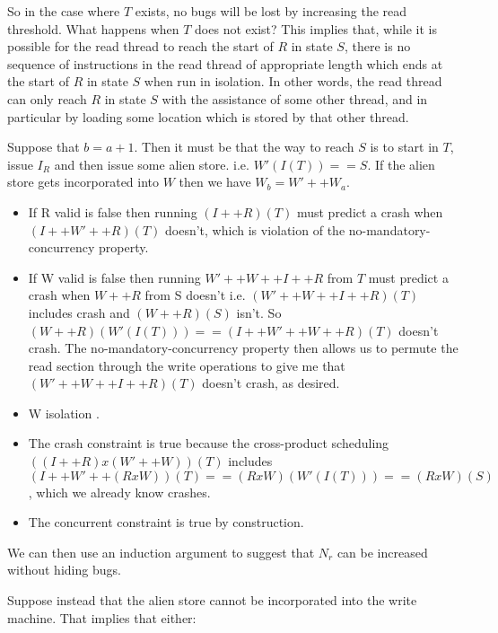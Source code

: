\documentclass[12pt,a4paper]{book}
\begin{document}
So in the case where $T$ exists, no bugs will be lost by increasing the read threshold.
What happens when $T$ does not exist?
This implies that, while it is possible for the read thread to reach the start of $R$ in state $S$, there is no sequence of instructions in the read thread of appropriate length which ends at the start of $R$ in state $S$ when run in isolation.
In other words, the read thread can only reach $R$ in state $S$ with the assistance of some other thread, and in particular by loading some location which is stored by that other thread.

Suppose that $b = a + 1$.
Then it must be that the way to reach $S$ is to start in $T$, issue $I_R$ and then issue some alien store.
i.e. $W'(I(T)) == S$.
If the alien store gets incorporated into $W$ then we have $W_b = W' ++ W_a$.

\begin{itemize}
\item
  If R valid is false then running $(I ++ R)(T)$ must predict a crash when $(I ++ W' ++ R)(T)$ doesn't, which is violation of the no-mandatory-concurrency property.
\item
  If W valid is false then running $W' ++ W ++ I ++ R$ from $T$ must predict a crash when $W ++ R$ from S doesn't
  i.e. $(W' ++ W ++ I ++ R)(T)$ includes crash and $(W ++ R)(S)$ isn't.
  So $(W ++ R)(W'(I(T))) == (I ++ W' ++ W ++ R)(T)$ doesn't crash.
  The no-mandatory-concurrency property then allows us to permute the read section through the write operations to give me that $(W' ++ W ++ I ++ R)(T)$ doesn't crash, as desired.
\item
  W isolation .
\item
  The crash constraint is true because the cross-product scheduling $((I ++ R) x (W' ++ W))(T)$ includes $(I ++ W' ++ (R x W))(T) == (R x W)(W'(I(T))) == (R x W)(S)$, which we already know crashes.
\item
  The concurrent constraint is true by construction.
\end{itemize}

We can then use an  induction argument to suggest that $N_r$ can be increased without hiding bugs.

Suppose instead that the alien store cannot be incorporated into the write machine.
That implies that either:
\end{document}
